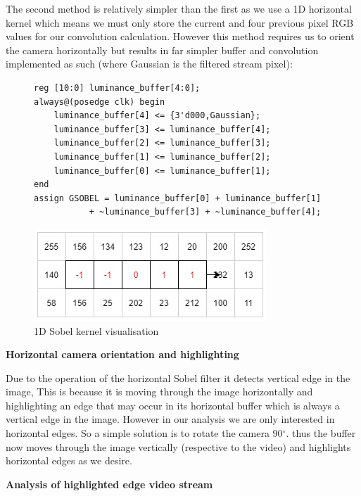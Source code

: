 \documentclass[10pt,twoside]{article}
\begin{document}
The second method is relatively simpler than the first as we use  a 1D horizontal kernel which  means we must only store the current and four previous pixel RGB values for our convolution calculation. However this method requires us to orient the camera horizontally but results in far simpler buffer and convolution implemented as such (where Gaussian is the filtered stream pixel):

\begin{figure}[hbt]
\begin{minipage}{.56\textwidth}
\begin{verbatim}
reg [10:0] luminance_buffer[4:0];
always@(posedge clk) begin
    luminance_buffer[4] <= {3'd000,Gaussian}; 
	luminance_buffer[3] <= luminance_buffer[4]; 
	luminance_buffer[2] <= luminance_buffer[3]; 
	luminance_buffer[1] <= luminance_buffer[2]; 
	luminance_buffer[0] <= luminance_buffer[1];
end
assign GSOBEL = luminance_buffer[0] + luminance_buffer[1] 
           + ~luminance_buffer[3] + ~luminance_buffer[4]; 
\end{verbatim}
\end{minipage}
\begin{minipage}{.42\textwidth}
            \includegraphics[scale = 0.4]{Method2Matrix.jpg}
            \centering
            \caption{1D Sobel kernel visualisation}
            \label{fig:InitalDesign}
\end{minipage}
\end{figure}

\textbf{Horizontal camera orientation and highlighting}

Due to the operation of the horizontal Sobel filter it detects vertical edge in the image, This is because it is moving through the image horizontally and highlighting an edge that may occur in its horizontal buffer which is always a vertical edge in the image. However in our analysis we are only interested in horizontal edges. So a simple solution  is to rotate the camera 90$^\circ$. thus the buffer now moves through the image vertically (respective to the video) and highlights horizontal edges as we desire.

\textbf{Analysis of highlighted edge video stream}
\end{document}

